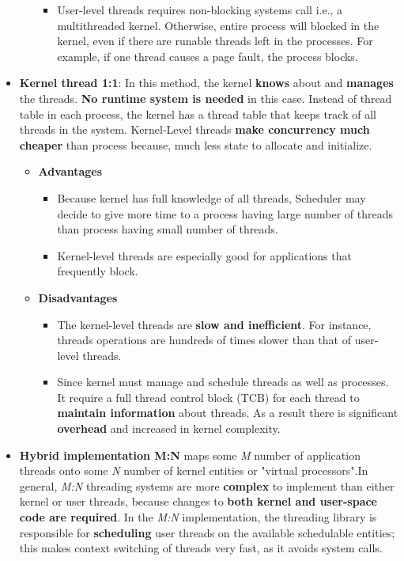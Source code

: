 \documentclass{article}
\begin{document}
\begin{flushleft}
\begin{itemize}
\begin{itemize}
\begin{itemize}
			\item User-level threads requires non-blocking systems call i.e., a multithreaded kernel. Otherwise, entire process will blocked in the kernel, even if there are runable threads left in the processes. For example, if one thread causes a page fault, the process blocks.
		\end{itemize}
	\end{itemize}
	\item \textbf{Kernel thread 1:1}: In this method, the kernel \textbf{knows} about and \textbf{manages} the threads. \textbf{No runtime system is needed} in this case. Instead of thread table in each process, the kernel has a thread table that keeps track of all threads in the system. Kernel-Level threads \textbf{make concurrency much cheaper} than process because, much less state to allocate and initialize.
	\begin{itemize}
		\item \textbf{Advantages}
		\begin{itemize}
			\item Because kernel has full knowledge of all threads, Scheduler may decide to give more time to a process having large number of threads than process having small number of threads.
			\item Kernel-level threads are especially good for applications that frequently block.
		\end{itemize}
	\end{itemize}
	\begin{itemize}
		\item \textbf{Disadvantages}
		\begin{itemize}
			\item The kernel-level threads are \textbf{slow and inefficient}. For instance, threads operations are hundreds of times slower than that of user-level threads.
			\item Since kernel must manage and schedule threads as well as processes. It require a full thread control block (TCB) for each thread to \textbf{maintain information} about threads. As a result there is significant \textbf{overhead} and increased in kernel complexity.		
		\end{itemize}
	\end{itemize}
	\item \textbf{Hybrid implementation M:N} maps some \textit{M} number of application threads onto some \textit{N} number of kernel entities or "virtual processors".In general, \textit{M:N} threading systems are more \textbf{complex} to implement than either kernel or user threads, because changes to \textbf{both kernel and user-space code are required}. In the \textit{M:N} implementation, the threading library is responsible for \textbf{scheduling} user threads on the available schedulable entities; this makes context switching of threads very fast, as it avoids system calls.

\end{itemize}
\end{flushleft}
\end{document}
